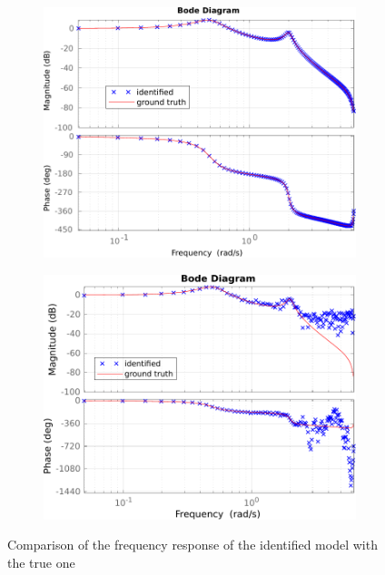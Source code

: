 \documentclass{scrartcl}
\newcommand*{\matlabcode}[3]{\begin{figure}[h!]\end{figure}}
\begin{document}
\begin{figure}[h]
	\begin{subfigure}{0.45\textwidth}
		\includegraphics[width=\textwidth]{figures/resp_nonoise.pdf}
		\label{fig:resp_noiseless}
	\end{subfigure}
	\hspace*{0.05\textwidth}
	\begin{subfigure}{0.45\textwidth}
		\includegraphics[width=\textwidth]{figures/resp_noise.pdf}
		\label{fig:resp_noise}
	\end{subfigure}
	\caption{Comparison of the frequency response of the identified model with the true one}\label{fig:f_resp}
\end{figure}
\matlabcode{../matlab/ce1/estimate_frequency_response.m}
{{Compute the frequency response of the system to be identified using an average of Fourier transforms of each period. The first period is skipped as we wait for transience to vanish. Additionally, the frequency vector is computed.}}
{lst:freq_resp}
\end{document}
